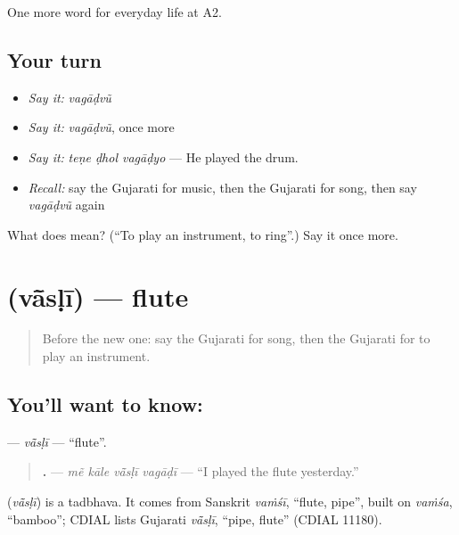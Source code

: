 \begin{grammarlens}[title={What you've built}]
One more word for everyday life at A2.
\end{grammarlens}

\subsection*{Your turn}
\begin{itemize}
\raggedright
  \item \emph{Say it:} \emph{vagāḍvũ}
  \item \emph{Say it:} \emph{vagāḍvũ}, once more
  \item \emph{Say it:} \emph{teṇe ḍhol vagāḍyo} — He played the drum.
  \item \emph{Recall:} say the Gujarati for music, then the Gujarati for song, then say \emph{vagāḍvũ} again
\end{itemize}

\begin{tcolorbox}[breakable,colback=teal!4,colframe=teal!35!black,title={Before you move on}]
What does  mean? (\textquotedblleft{}To play an instrument, to ring\textquotedblright{}.) Say it once more.
\end{tcolorbox}
\section[\texorpdfstring{\gu{વાંસળી} (vā̃sḷī)}{વાંસળી (vā̃sḷī)}]{ (vā̃sḷī) — flute}

\label{lesson:GU-C254-vasli}



\begin{quote}
Before the new one: say the Gujarati for song, then the Gujarati for to play an instrument.
\end{quote}

\subsection*{You'll want to know: }
\textbf{} — \emph{vā̃sḷī} — \textquotedblleft{}flute\textquotedblright{}.

\begin{quote}
\textbf{   .} — \emph{mẽ kāle vā̃sḷī vagāḍī} — \textquotedblleft{}I played the flute yesterday.\textquotedblright{}
\end{quote}

\begin{cousinweb}
\textbf{} (\emph{vā̃sḷī}) is a tadbhava. It comes from Sanskrit \emph{vaṁśī}, \textquotedblleft{}flute, pipe\textquotedblright{}, built on \emph{vaṁśa}, \textquotedblleft{}bamboo\textquotedblright{}; CDIAL lists Gujarati \emph{vā̃sḷī}, \textquotedblleft{}pipe, flute\textquotedblright{} (CDIAL 11180).
\end{cousinweb}

